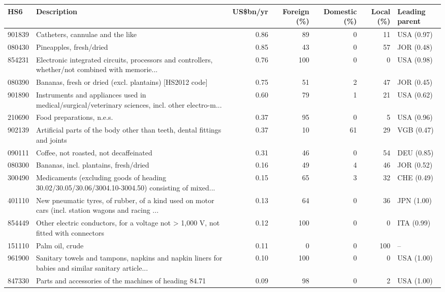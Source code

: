 \begin{tabular}{@{}l p{6.4cm} r r r r l@{}}
\toprule
HS6 & Description & US\$bn/yr & Foreign (\%) & Domestic (\%) & Local (\%) & Leading parent \\
\midrule
901839 & Catheters, cannulae and the like & 0.86 & 89 & 0 & 11 & USA (0.97) \\
080430 & Pineapples, fresh/\allowbreak{}dried & 0.85 & 43 & 0 & 57 & JOR (0.48) \\
854231 & Electronic integrated  circuits, processors and controllers, whether/\allowbreak{}not combined with memorie... & 0.76 & 100 & 0 & 0 & USA (0.98) \\
080390 & Bananas, fresh or dried (excl. plantains) [HS2012 code] & 0.75 & 51 & 2 & 47 & JOR (0.45) \\
901890 & Instruments and appliances used in medical/\allowbreak{}surgical/\allowbreak{}veterinary sciences, incl. other electro-m... & 0.60 & 79 & 1 & 21 & USA (0.62) \\
210690 & Food preparations, n.e.s. & 0.37 & 95 & 0 & 5 & USA (0.96) \\
902139 & Artificial parts of the body other than teeth, dental fittings and joints & 0.37 & 10 & 61 & 29 & VGB (0.47) \\
090111 & Coffee, not roasted, not decaffeinated & 0.31 & 46 & 0 & 54 & DEU (0.85) \\
080300 & Bananas, incl. plantains, fresh/\allowbreak{}dried & 0.16 & 49 & 4 & 46 & JOR (0.52) \\
300490 & Medicaments (excluding goods of heading 30.02/\allowbreak{}30.05/\allowbreak{}30.06/\allowbreak{}3004.10-3004.50) consisting of mixed... & 0.15 & 65 & 3 & 32 & CHE (0.49) \\
401110 & New pneumatic tyres, of rubber, of a kind used on motor cars (incl. station wagons and racing ... & 0.13 & 64 & 0 & 36 & JPN (1.00) \\
854449 & Other electric conductors, for a voltage not > 1,000 V, not fitted with connectors & 0.12 & 100 & 0 & 0 & ITA (0.99) \\
151110 & Palm oil, crude & 0.11 & 0 & 0 & 100 & -- \\
961900 & Sanitary towels and tampons, napkins and napkin liners for babies and similar sanitary article... & 0.10 & 100 & 0 & 0 & USA (1.00) \\
847330 & Parts and accessories of the machines of heading 84.71 & 0.09 & 98 & 0 & 2 & USA (1.00) \\
\bottomrule
\end{tabular}
